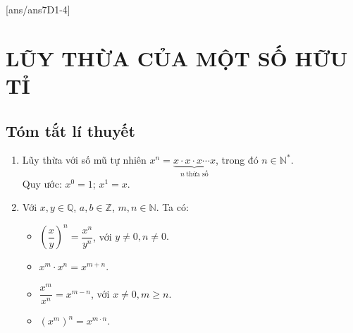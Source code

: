 [ans/ans7D1-4]
\section{LŨY THỪA CỦA MỘT SỐ HỮU TỈ}
\subsection{Tóm tắt lí thuyết}
\begin{enumerate}[\tickEX]
\item Lũy thừa với số mũ tự nhiên 
	$ x^n = \underbrace{x\cdot x \cdot x \cdots x}_{n \  \text{thừa số}}  $, trong đó $ n \in \mathbb{N}^* $.\\
	Quy ước: $ x^0 = 1  $; $ x^1 = x. $
\item Với $ x,y \in \mathbb{Q} $, $ a,b \in \mathbb{Z} $, $ m,n \in \mathbb{N} $. Ta có:\\
	\begin{itemize}
		\item $ \left(\dfrac{x}{y}\right)^n = \dfrac{x^n}{y^n} $, với $ y \ne 0, n \ne 0. $
		\item $ x^m \cdot x^n = x^{m+n} $.
		\item  $ \dfrac{x^m}{x^n}=x^{m-n} $, với $ x \ne 0, m \ge n. $
		\item $ \left(x^m\right)^n = x^{m \cdot n}. $
	\end{itemize}
\end{enumerate}
